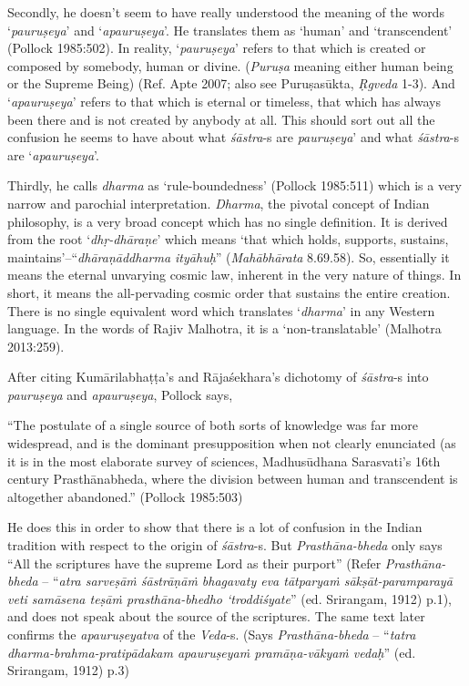 Secondly, he doesn't seem to have really understood the meaning of the words `{\it pauruṣeya}' and `{\it apauruṣeya}'. He translates them as `human' and `transcendent' (Pollock 1985:502). In reality, `{\it pauruṣeya}' refers to that which is created or composed by somebody, human or divine. ({\it Puruṣa} meaning either human being or the Supreme Being) (Ref. Apte 2007; also see Puruṣasūkta, {\it Ṛgveda} 1-3). And `{\it apauruṣeya}' refers to that which is eternal or timeless, that which has always been there and is not created by anybody at all. This should sort out all the confusion he seems to have about what {\it śāstra}-s are {\it pauruṣeya}' and what {\it śāstra}-s are `{\it apauruṣeya}'. 

Thirdly, he calls {\it dharma} as `rule-boundedness' (Pollock 1985:511) which is a very narrow and parochial interpretation. {\it Dharma}, the pivotal concept of Indian philosophy, is a very broad concept which has no single definition. It is derived from the root `\textit{dhṛ-dhāraṇe}' which means `that which holds, supports, sustains, maintains'--``\textit{dhāraṇāddharma ityāhuḥ}'' ({\it Mahābhārata} 8.69.58). So, essentially it means the eternal unvarying cosmic law, inherent in the very nature of things. In short, it means the all-pervading cosmic order that sustains the entire creation. There is no single equivalent word which translates `{\it dharma}' in any Western language. In the words of Rajiv Malhotra, it is a `non-translatable' (Malhotra 2013:259).

After citing Kumārilabhaṭṭa's and Rājaśekhara's dichotomy of {\it śāstra}-s into {\it pauruṣeya} and {\it apauruṣeya}, Pollock says,
\begin{myquote}
``The postulate of a single source of both sorts of knowledge was far more widespread, and is the dominant presupposition when not clearly enunciated (as it is in the most elaborate survey of sciences, Madhusūdhana Sarasvati's 16th century Prasthānabheda, where the division between human and transcendent is altogether abandoned.'' (Pollock 1985:503)
\end{myquote}

He does this in order to show that there is a lot of confusion in the Indian tradition with respect to the origin of {\it śāstra}-s. But \textit{Prasthāna-bheda} only says ``All the scriptures have the supreme Lord as their purport'' (Refer \textit{Prasthāna-bheda} -- ``\textit{atra sarveṣāṁ śāstrāṇāṁ bhagavaty eva tātparyaṁ sākṣāt-paramparayā veti samāsena teṣāṁ prasthāna-bhedho `troddiśyate}'' (ed. Srirangam, 1912) p.1), and does not speak about the source of the scriptures. The same text later confirms the {\it apauruṣeyatva} of the {\it Veda}-s. (Says \textit{Prasthāna-bheda} -- ``\textit{tatra dharma-brahma-pratipādakam apauruṣeyaṁ pramāṇa-vākyaṁ vedaḥ}'' (ed. Srirangam, 1912) p.3)

